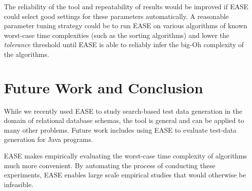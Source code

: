 \documentclass[10pt,twocolumn]{article}
\newcommand{\toolname}{{\sc EASE}\xspace}
\begin{document}
  The reliability of the tool and repeatability of results would be
  improved if \toolname could select good settings for these
  parameters automatically. A reasonable parameter tuning strategy could
  be to run \toolname on various algorithms of known worst-case
  time complexities (such as the sorting algorithms) and lower the
  \textit{tolerance} threshold until \toolname is able to reliably 
  infer the big-Oh complexity of the algorithms.

\section{Future Work and Conclusion} 
  While we recently used \toolname to study search-based test data
  generation in the domain of relational database schemas, the tool is
  general and can be applied to many other problems. Future work
  includes using \toolname to evaluate test-data generation for Java
  programs.


  \toolname makes empirically evaluating the worst-case time
  complexity of algorithms much more convenient. By automating the
  process of conducting these experiments, \toolname enables large
  scale empirical studies that would otherwise be infeasible.

\setlength{\bibitemsep}{.075in}
{\footnotesize
  
}
\end{document}
